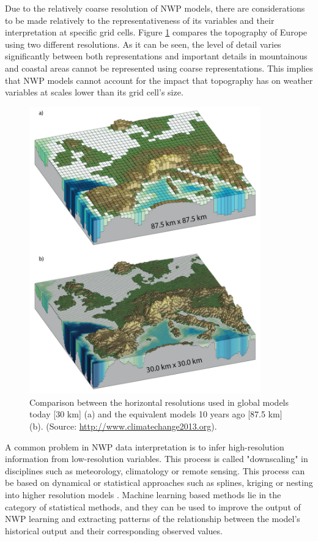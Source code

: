\medskip

Due to the relatively coarse resolution of NWP models, there are considerations to be made relatively to the representativeness of its variables and their interpretation at specific grid cells. Figure \ref{model_resolution} compares the topography of Europe using two different resolutions. As it can be seen, the level of detail varies significantly between both representations and important details in mountainous and coastal areas cannot be represented using coarse representations. This implies that NWP models cannot account for the impact that topography has on weather variables at scales lower than its grid cell's size. 

\medskip

\begin{figure}[h]
 \centerline{\includegraphics[width=10cm]{nwp_resolution.jpg}} \caption{Comparison between the horizontal resolutions used in global models today [30 km] (a) and the equivalent models 10 years ago [87.5 km] (b). (Source: \url{http://www.climatechange2013.org}).}\label{model_resolution}
\end{figure}

A common problem in NWP data interpretation is to infer high-resolution information from low-resolution variables. This process is called "downscaling" in disciplines such as meteorology, climatology or remote sensing. This process can be based on dynamical or statistical approaches such as splines, kriging or nesting into higher resolution models \citep{peng2017review}. Machine learning based methods lie in the category of statistical methods, and they can be used to improve the output of NWP learning and extracting patterns of the relationship between the model's historical output and their corresponding observed values.


